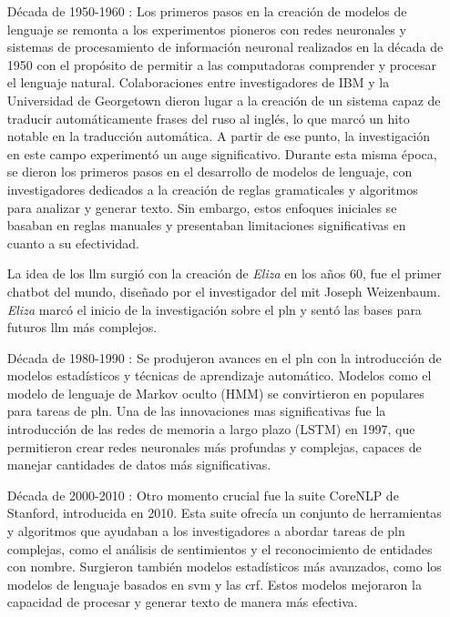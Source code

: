 \begin{itemize}

\item[Década de 1950-1960]: Los primeros pasos en la creación de modelos de lenguaje se remonta a los experimentos pioneros con redes neuronales y sistemas de procesamiento de información neuronal realizados en la década de 1950 con el propósito de permitir a las computadoras comprender y procesar el lenguaje natural. Colaboraciones entre investigadores de IBM y la Universidad de Georgetown dieron lugar a la creación de un sistema capaz de traducir automáticamente frases del ruso al inglés, lo que marcó un hito notable en la traducción automática. A partir de ese punto, la investigación en este campo experimentó un auge significativo. Durante esta misma época, se dieron los primeros pasos en el desarrollo de modelos de lenguaje, con investigadores dedicados a la creación de reglas gramaticales y algoritmos para analizar y generar texto. Sin embargo, estos enfoques iniciales se basaban en reglas manuales y presentaban limitaciones significativas en cuanto a su efectividad.

La idea de los \acrshort{llm} surgió con la creación de \textit{Eliza} en los años 60, fue el primer chatbot del mundo, diseñado por el investigador del \acrshort{mit} Joseph Weizenbaum. \textit{Eliza} marcó el inicio de la investigación sobre el \acrfull{pln} y sentó las bases para futuros \acrshort{llm} más complejos.

\item[Década de 1980-1990]: Se produjeron avances en el \acrfull{pln} con la introducción de modelos estadísticos y técnicas de aprendizaje automático. Modelos como el modelo de lenguaje de Markov oculto (HMM) se convirtieron en populares para tareas de \acrshort{pln}. Una de las innovaciones mas significativas fue la introducción de las redes de memoria a largo plazo (LSTM) en 1997, que permitieron crear redes neuronales más profundas y complejas, capaces de manejar cantidades de datos más significativas.

\item[Década de 2000-2010]: Otro momento crucial fue la suite CoreNLP de Stanford, introducida en 2010. Esta suite ofrecía un conjunto de herramientas y algoritmos que ayudaban a los investigadores a abordar tareas de \acrshort{pln} complejas, como el análisis de sentimientos y el reconocimiento de entidades con nombre. Surgieron también modelos estadísticos más avanzados, como los modelos de lenguaje basados en \acrfull{svm} y las \acrfull{crf}. Estos modelos mejoraron la capacidad de procesar y generar texto de manera más efectiva.


\end{itemize}
